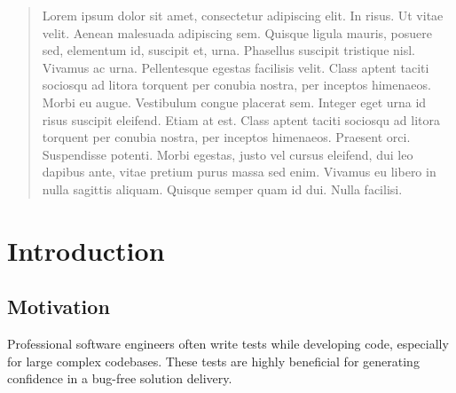 \documentclass{icldt}
\numberwithin{equation}{section}       %
\begin{document}
	
\begin{abstract}
Lorem ipsum dolor sit amet, consectetur adipiscing elit. In risus. Ut vitae velit. Aenean malesuada adipiscing sem. Quisque ligula mauris, posuere sed, elementum id, suscipit et, urna. Phasellus suscipit tristique nisl. Vivamus ac urna. Pellentesque egestas facilisis velit. Class aptent taciti sociosqu ad litora torquent per conubia nostra, per inceptos himenaeos. Morbi eu augue. Vestibulum congue placerat sem. Integer eget urna id risus suscipit eleifend. Etiam at est. Class aptent taciti sociosqu ad litora torquent per conubia nostra, per inceptos himenaeos. Praesent orci. Suspendisse potenti. Morbi egestas, justo vel cursus eleifend, dui leo dapibus ante, vitae pretium purus massa sed enim. Vivamus eu libero in nulla sagittis aliquam. Quisque semper quam id dui. Nulla facilisi.	
\end{abstract}
	
	\tableofcontents
\chapter{Introduction}

\section{Motivation}	%
Professional software engineers often write tests while developing code, especially for large complex codebases. These tests are highly beneficial for generating confidence in a bug-free solution delivery.
\end{document}
